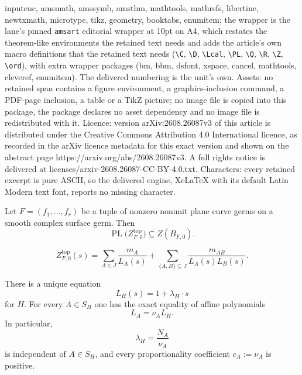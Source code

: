 \documentclass[10pt,a4paper]{amsart}
\DeclareMathOperator{\PL}{PL}
\begin{document}
inputenc, amsmath, amssymb, amsthm, mathtools, mathrsfs, libertine, newtxmath, microtype, tikz, geometry, booktabs, enumitem; the wrapper is the lane's pinned \texttt{amsart} editorial wrapper at 10pt on A4, which restates the theorem-like environments the retained text needs and adds the article's own macro definitions that the retained text needs (\texttt{\textbackslash C}, \texttt{\textbackslash D}, \texttt{\textbackslash Lcal}, \texttt{\textbackslash PL}, \texttt{\textbackslash Q}, \texttt{\textbackslash R}, \texttt{\textbackslash Z}, \texttt{\textbackslash ord}), with extra wrapper packages (bm, bbm, dsfont, xspace, cancel, mathtools, cleveref, enumitem). The delivered numbering is the unit's own. Assets: no retained span contains a figure environment, a graphics-inclusion command, a PDF-page inclusion, a table or a TikZ picture; no image file is copied into this package, the package declares no asset dependency and no image file is redistributed with it. Licence: version arXiv:2608.26087v3 of this article is distributed under the Creative Commons Attribution 4.0 International licence, as recorded in the arXiv licence metadata for this exact version and shown on the abstract page https://arxiv.org/abs/2608.26087v3. A full rights notice is delivered at licenses/arxiv-2608.26087-CC-BY-4.0.txt. Characters: every retained excerpt is pure ASCII, so the delivered engine, XeLaTeX with its default Latin Modern text font, reports no missing character.
\begin{maintheorem}[{=\,\Cref{thm:main-thm-top}}]\label{thm:main-intro}
Let $F=(f_1,\ldots,f_r)$ be a tuple of nonzero nonunit plane curve germs on a smooth complex surface germ. Then
\[
\PL\bigl(Z^{\mathrm{top}}_{F,0}\bigr)\subseteq Z(B_{F,0}).
\]
\end{maintheorem}

\begin{equation}\label{eq:surface-zeta}
 Z^{\mathrm{top}}_{F,0}(s)
 =
 \sum_{A\in J}\frac{m_A}{L_A(s)}
 +
 \sum_{\{A,B\}\subseteq J}
 \frac{m_{AB}}{L_A(s)L_B(s)}.
\end{equation}

\begin{lemma}\label{lem:positive-wall-normalization}
There is a unique equation
\begin{equation}\label{eq:normalized-wall}
 L_H(s)=1+\lambda_H\cdot s
\end{equation}
for $H$. For every $A\in S_H$ one has the exact equality of affine polynomials
\begin{equation}\label{eq:positive-wall-multiple}
 L_A=\nu_A L_H.
\end{equation}
In particular,
\[
 \lambda_H=\frac{N_A}{\nu_A}
\]
is independent of $A\in S_H$, and every proportionality coefficient $c_A:=\nu_A$ is positive.
\end{lemma}
\end{document}
